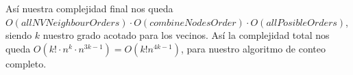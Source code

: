 Así nuestra complejidad final nos queda $O(allNVNeighbourOrders) \cdot O(combineNodesOrder) \cdot O(allPosibleOrders)$, siendo $k$ nuestro grado acotado para los vecinos. Así la complejidad total nos queda $O(k! \cdot n^k \cdot  n^{3k-1}) = O(k! n^{4k-1})$, para nuestro algoritmo de conteo completo. 





